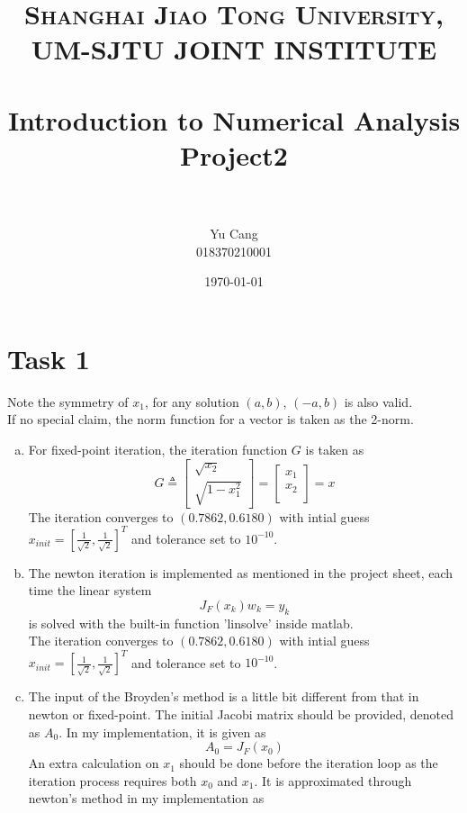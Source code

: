\documentclass[paper=a4, fontsize=11pt]{scrartcl} %
\title{	
\normalfont \normalsize 
\textsc{Shanghai Jiao Tong University, UM-SJTU JOINT INSTITUTE} \\ [25pt] %
\horrule{0.5pt} \\[0.4cm] %
\huge Introduction to Numerical Analysis \\ Project2 \\ %
\horrule{2pt} \\[0.5cm] %
}
\author{Yu Cang \\ 018370210001} %
\date{\normalsize \today} %
\numberwithin{equation}{section} %
\numberwithin{figure}{section} %
\numberwithin{table}{section} %
\begin{document}
\maketitle %

\section{Task 1}
	Note the symmetry of $x_1$, for any solution $(a, b)$, $(-a, b)$ is also valid.\\
	If no special claim, the norm function for a vector is taken as the 2-norm.
	\begin{enumerate}[(a)]
		\item
			For fixed-point iteration, the iteration function $G$ is taken as
			\begin{equation}
				G \triangleq
				\begin{bmatrix}
					\sqrt{x_2}\\
					\sqrt{1-x_1^2}
				\end{bmatrix}
				=
				\begin{bmatrix}
					x_1\\
					x_2\\
				\end{bmatrix}
				=x
			\end{equation}
			The iteration converges to $(0.7862, 0.6180)$ with intial guess $x_{init} = [\frac{1}{\sqrt{2}}, \frac{1}{\sqrt{2}}]^T$ and tolerance set to $10^{-10}$. 
		\item 
			The newton iteration is implemented as mentioned in the project sheet, each time the linear system
			\begin{equation}
				J_F(x_k) w_k = y_k
			\end{equation}
			is solved with the built-in function 'linsolve' inside matlab.\\
			The iteration converges to $(0.7862, 0.6180)$ with intial guess $x_{init} = [\frac{1}{\sqrt{2}}, \frac{1}{\sqrt{2}}]^T$ and tolerance set to $10^{-10}$. 
		\item
			The input of the Broyden's method is a little bit different from that in newton or fixed-point. The initial Jacobi matrix should be provided, denoted as $A_0$. In my implementation, it is given as
			\begin{equation}
				A_0 = J_F(x_0)
			\end{equation}
			An extra calculation on $x_1$ should be done before the iteration loop as the iteration process requires both $x_0$ and $x_1$. It is approximated through newton's method in my implementation as

\end{enumerate}
\end{document}
